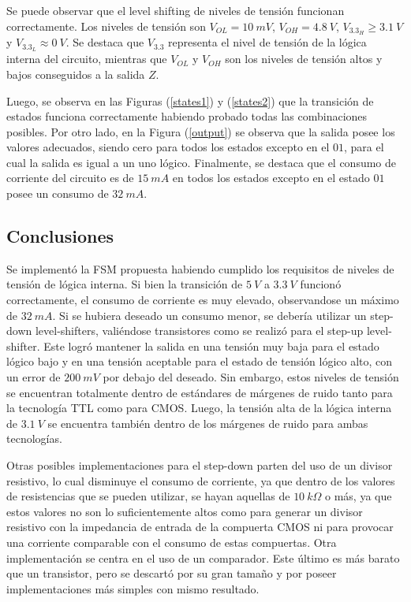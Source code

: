 Se puede observar que el level shifting de niveles de tensión funcionan correctamente. Los niveles de tensión son $V_{OL} = 10 \ mV$, $V_{OH} = 4.8 \ V$, $V_{3.3_{H}} \geq 3.1 \ V$ y $V_{3.3_{L}} \approx 0 \ V$. Se destaca que $V_{3.3}$ representa el nivel de tensión de la lógica interna del circuito, mientras que $V_{OL}$ y $V_{OH}$ son los niveles de tensión altos y bajos conseguidos a la salida $Z$.

Luego, se observa en las Figuras (\ref{states1}) y (\ref{states2}) que la transición de estados funciona correctamente habiendo probado todas las combinaciones posibles. Por otro lado, en la Figura (\ref{output}) se observa que la salida posee los valores adecuados, siendo cero para todos los estados excepto en el $01$, para el cual la salida es igual a un uno lógico. Finalmente, se destaca que el consumo de corriente del circuito es de $15 \ mA$ en todos los estados excepto en el estado $01$ posee un consumo de $32 \ mA$.

\subsection{Conclusiones}

Se implementó la FSM propuesta habiendo cumplido los requisitos de niveles de tensión de lógica interna. Si bien la transición de $5 \ V$ a $3.3 \ V$ funcionó correctamente, el consumo de corriente es muy elevado, observandose un máximo de $32 \ mA$. Si se hubiera deseado un consumo menor, se debería utilizar un step-down level-shifters, valiéndose transistores como se realizó para el step-up level-shifter. Este logró mantener la salida en una tensión muy baja para el estado lógico bajo y en una tensión aceptable para el estado de tensión lógico alto, con un error de $200 \ mV$ por debajo del deseado. Sin embargo, estos niveles de tensión se encuentran totalmente dentro de estándares de márgenes de ruido tanto para la tecnología TTL como para CMOS. Luego, la tensión alta de la lógica interna de $3.1 \ V$ se encuentra también dentro de los márgenes de ruido para ambas tecnologías.

Otras posibles implementaciones para el step-down parten del uso de un divisor resistivo, lo cual disminuye el consumo de corriente, ya que dentro de los valores de resistencias que se pueden utilizar, se hayan aquellas de $10 \ k\Omega$ o más, ya que estos valores no son lo suficientemente altos como para generar un divisor resistivo con la impedancia de entrada de la compuerta CMOS ni para provocar una corriente comparable con el consumo de estas compuertas. Otra implementación se centra en el uso de un comparador. Este último es más barato que un transistor, pero se descartó por su gran tamaño y por poseer implementaciones más simples con mismo resultado.